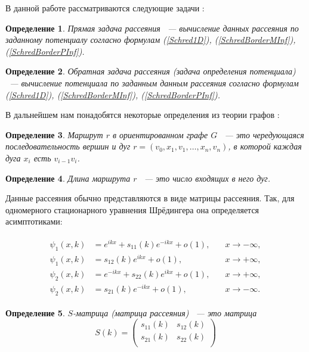 \documentclass[a4 paper, 12 pt]{extarticle}
\newtheorem{Def}{Определение}[section]
\begin{document}
   \pagebreak
   В данной работе рассматриваются следующие задачи \cite{Soliton}: 

   \begin{Def}
   	Прямая задача рассеяния ~--- вычисление данных рассеяния по заданному потенциалу согласно формулам (\ref{Schred1D}), (\ref{SchredBorderMInf}), (\ref{SchredBorderPInf}).
   \end{Def}

   \begin{Def}
   	Обратная задача рассеяния (задача определения потенциала) ~--- вычисление потенциала по заданным данным рассеяния согласно формулам (\ref{Schred1D}), (\ref{SchredBorderMInf}), (\ref{SchredBorderPInf}).
   \end{Def}

    В дальнейшем нам понадобятся некоторые определения из теории графов \cite{Emelichev}:

   \begin{Def}
   Маршрут $r$ в ориентированном графе $G$ ~--- это чередующаяся последовательность вершин и дуг $r = \left(v_0, x_1, v_1, \ldots, x_n, v_n\right)$, в которой каждая дуга $x_i$ есть $v_{i-1} v_i$.
   \end{Def}
   
   \begin{Def}
   	Длина маршрута $r$ ~--- это число входящих в него дуг.
   \end{Def}

   Данные рассеяния обычно представляются в виде матрицы рассеяния. Так, для одномерного стационарного уравнения Шрёдингера она определяется асимптотиками:
   
   \begin{gather*}
   \begin{aligned}
   \psi_1(x,k)&=e^{ikx}+s_{11}(k)e^{-ikx}+o(1), \quad &x\rightarrow-\infty,\\
   \psi_1(x,k)&=s_{12}(k)e^{ikx}+o(1), \quad &x\rightarrow+\infty,\\
   \psi_2(x,k)&=e^{-ikx}+s_{22}(k)e^{ikx}+o(1), \quad &x\rightarrow+\infty,\\
   \psi_2(x,k)&=s_{21}(k)e^{-ikx}+o(1), \quad &x\rightarrow-\infty.
   \end{aligned}
   \end{gather*}
   

   \begin{Def}
   	$S$-матрица (матрица рассеяния) ~--- это матрица 
    \begin{equation}\label{DSM}
    S(k)=\left(%
    \begin{array}{cc}
    s_{11}(k) & s_{12}(k) \\
    s_{21}(k) & s_{22}(k) \\
    \end{array}%
    \right)
    \end{equation}
   \end{Def}
\end{document}
